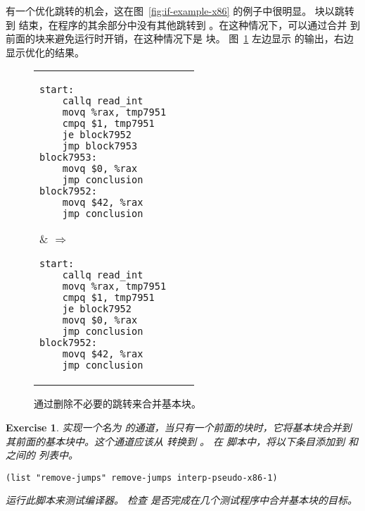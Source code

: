 \documentclass[11pt]{book}
\newtheorem{exercise}[theorem]{Exercise}
\begin{document}


有一个优化跳转的机会，这在图~\ref{fig:if-example-x86} 的例子中很明显。  块以跳转到  结束，在程序的其余部分中没有其他跳转到
 。在这种情况下，可以通过合并 
到前面的块来避免运行时开销，在这种情况下是  块。
图~\ref{fig:remove-jumps} 左边显示
 的输出，右边显示优化的结果。

\begin{figure}[tbp]
\begin{tabular}{lll}
\begin{minipage}{0.5\textwidth}
\begin{lstlisting}
start:
    callq read_int
    movq %rax, tmp7951
    cmpq $1, tmp7951
    je block7952
    jmp block7953
block7953:
    movq $0, %rax
    jmp conclusion
block7952:
    movq $42, %rax
    jmp conclusion
\end{lstlisting}
\end{minipage}
&
$\Rightarrow\qquad$
\begin{minipage}{0.4\textwidth}
\begin{lstlisting}
start:
    callq read_int
    movq %rax, tmp7951
    cmpq $1, tmp7951
    je block7952
    movq $0, %rax
    jmp conclusion
block7952:
    movq $42, %rax
    jmp conclusion
\end{lstlisting}
\end{minipage}
\end{tabular}
\caption{通过删除不必要的跳转来合并基本块。}
\label{fig:remove-jumps}
\end{figure}

\begin{exercise}\normalfont
%
实现一个名为  的通道，当只有一个前面的块时，它将基本块合并到其前面的基本块中。这个通道应该从 \LangXIfVar{} 转换到 \LangXIfVar{} 。
%  
在  脚本中，将以下条目添加到 
和  之间的  列表中。
\begin{lstlisting}
(list "remove-jumps" remove-jumps interp-pseudo-x86-1)
\end{lstlisting}
运行此脚本来测试编译器。
%
检查  是否完成在几个测试程序中合并基本块的目标。
\end{exercise}
\end{document}
